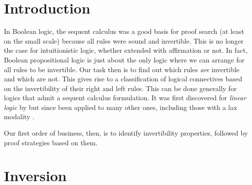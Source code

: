 \documentclass[11pt]{article}
\begin{document}
\maketitle

\section{Introduction}

In Boolean logic, the sequent calculus was a good basis for proof search (at
least on the small scale) because all rules were sound and invertible.  This is
no longer the case for intuitionistic logic, whether extended with affirmation
or not.  In fact, Boolean propositional logic is just about the only logic where
we can arrange for all rules to be invertible.  Our task then is to find out
which rules \emph{are} invertible and which are not.  This gives rise to a
classification of logical connectives based on the invertibility of their right
and left rules.  This can be done generally for logics that admit a sequent
calculus formulation.  It was first discovered for \emph{linear logic}
\citep{Girard87tcs} by \citet{Andreoli92jlc} but since been applied to many
other ones, including those with a lax modality \citep{Liang09tcs,Watkins02tr}.

Our first order of business, then, is to identify invertibility properties,
followed by proof strategies based on them.

\section{Inversion}
\end{document}
